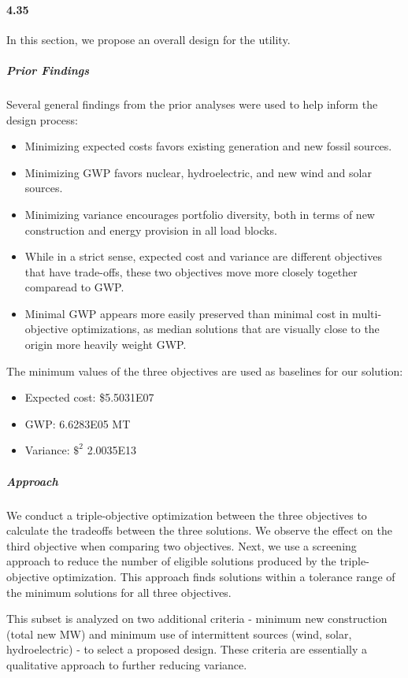 \documentclass{article}
\begin{document}
\paragraph{4.35}
	In this section, we propose an overall design for the utility.
	
	\subparagraph{Prior Findings}
		Several general findings from the prior analyses were used to help inform the design process:
	
	\begin{itemize}
		\item Minimizing expected costs favors existing generation and new fossil sources.
		\item Minimizing GWP favors nuclear, hydroelectric, and new wind and solar sources.
		\item Minimizing variance encourages portfolio diversity, both in terms of new construction and energy provision in all load blocks.
		\item While in a strict sense, expected cost and variance are different objectives that have trade-offs, these two objectives move more closely together comparead to GWP.
		\item Minimal GWP appears more easily preserved than minimal cost in multi-objective optimizations, as median solutions that are visually close to the origin more heavily weight GWP.
	\end{itemize}

	The minimum values of the three objectives are used as baselines for our solution:
	
	\begin{itemize}
		\item Expected cost: \$5.5031E07
		\item GWP: 6.6283E05 MT
		\item Variance: $\$^2$ 2.0035E13
	\end{itemize}
	
	\subparagraph{Approach}
		We conduct a triple-objective optimization between the three objectives to calculate the tradeoffs between the three solutions. We observe the effect on the third objective when comparing two objectives. Next, we use a screening approach to reduce the number of eligible solutions produced by the triple-objective optimization. This approach finds solutions within a tolerance range of the minimum solutions for all three objectives. 
		
		This subset is analyzed on two additional criteria - minimum new construction (total new MW) and minimum use of intermittent sources (wind, solar, hydroelectric) - to select a proposed design. These criteria are essentially a qualitative approach to further reducing variance. 
		
\end{document}
